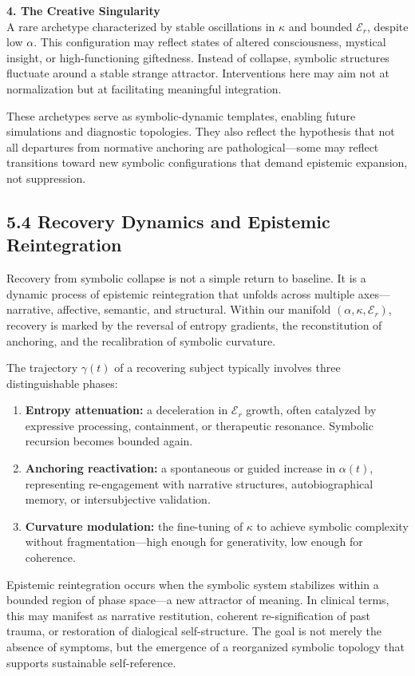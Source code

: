 \textbf{4. The Creative Singularity} \\
A rare archetype characterized by stable oscillations in $\kappa$ and bounded $\mathcal{E}_r$, despite low $\alpha$. This configuration may reflect states of altered consciousness, mystical insight, or high-functioning giftedness. Instead of collapse, symbolic structures fluctuate around a stable strange attractor. Interventions here may aim not at normalization but at facilitating meaningful integration.

These archetypes serve as symbolic-dynamic templates, enabling future simulations and diagnostic topologies. They also reflect the hypothesis that not all departures from normative anchoring are pathological—some may reflect transitions toward new symbolic configurations that demand epistemic expansion, not suppression.

\subsection*{5.4 Recovery Dynamics and Epistemic Reintegration}

Recovery from symbolic collapse is not a simple return to baseline. It is a dynamic process of epistemic reintegration that unfolds across multiple axes—narrative, affective, semantic, and structural. Within our manifold $(\alpha, \kappa, \mathcal{E}_r)$, recovery is marked by the reversal of entropy gradients, the reconstitution of anchoring, and the recalibration of symbolic curvature.

The trajectory $\gamma(t)$ of a recovering subject typically involves three distinguishable phases:

\begin{enumerate}
  \item \textbf{Entropy attenuation:} a deceleration in $\mathcal{E}_r$ growth, often catalyzed by expressive processing, containment, or therapeutic resonance. Symbolic recursion becomes bounded again.
  \item \textbf{Anchoring reactivation:} a spontaneous or guided increase in $\alpha(t)$, representing re-engagement with narrative structures, autobiographical memory, or intersubjective validation.
  \item \textbf{Curvature modulation:} the fine-tuning of $\kappa$ to achieve symbolic complexity without fragmentation—high enough for generativity, low enough for coherence.
\end{enumerate}

Epistemic reintegration occurs when the symbolic system stabilizes within a bounded region of phase space—a new attractor of meaning. In clinical terms, this may manifest as narrative restitution, coherent re-signification of past trauma, or restoration of dialogical self-structure. The goal is not merely the absence of symptoms, but the emergence of a reorganized symbolic topology that supports sustainable self-reference.

